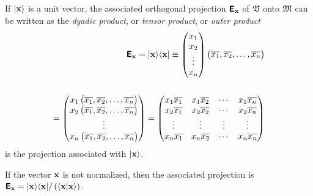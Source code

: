 If $\vert {\bf x}\rangle $ is a unit vector,
the associated orthogonal projection  $\textsf{\textbf{E}}_{\bf x}$ of   ${\frak V}$ onto  ${\frak M}$
can be written as the
{\em dyadic product}, or {\em tensor product}, or {\em outer product}
\begin{equation}
\begin{split}
\textsf{\textbf{E}}_{\bf x} =   \vert{\bf x}\rangle \langle {\bf x}\vert
\equiv
\begin{pmatrix}
x_1\\
x_2\\
\vdots \\
x_n
\end{pmatrix}
\begin{pmatrix}\overline{x_1},\overline{x_2},\ldots ,\overline{x_n}\end{pmatrix}\\
\\
=
\begin{pmatrix}
x_1\begin{pmatrix}\overline{x_1},\overline{x_2},\ldots ,\overline{x_n}\end{pmatrix}\\
x_2\begin{pmatrix}\overline{x_1},\overline{x_2},\ldots ,\overline{x_n}\end{pmatrix}\\
\vdots  \\
x_n\begin{pmatrix}\overline{x_1},\overline{x_2},\ldots ,\overline{x_n} \end{pmatrix}
\end{pmatrix}
=
\begin{pmatrix}
x_1\overline{x_1}&x_1\overline{x_2}& \cdots&x_1\overline{x_n}\\
x_2\overline{x_1}&x_2\overline{x_2}& \cdots&x_2\overline{x_n}\\
\vdots & \vdots & \vdots &\vdots \\
x_n\overline{x_1}&x_n\overline{x_2}& \cdots&x_n\overline{x_n}
\end{pmatrix}
\end{split}
\end{equation}
is the projection
associated with $\vert {\bf x}\rangle $.

If the vector ${\bf x}$ is not normalized,
then the associated projection is
$
\textsf{\textbf{E}}_{\bf x} =  \vert{\bf x}\rangle \langle {\bf x}\vert / \left(\langle {\bf x}\vert {\bf x}\rangle \right)
$.


